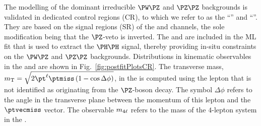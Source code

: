 The modelling of the dominant irreducible $\PW\PZ$ and $\PZ\PZ$ backgrounds is validated in dedicated control regions (CR),
to which we refer to as the ``\threeLeptonCR'' and ``\fourLeptonCR''.
They are based on the signal regions (SR) of the \threeLeptonZeroTau and \fourLeptonZeroTau channels,
the sole modification being that the $\PZ$-veto is inverted.
The \threeLeptonCR and \fourLeptonCR are included in the ML fit that is used to extract the $\PHiggs\PHiggs$ signal,
thereby providing in-situ constraints on the $\PW\PZ$ and $\PZ\PZ$ backgrounds.
Distributions in kinematic observables in the \threeLeptonCR and \fourLeptonCR are shown in Fig.~\ref{fig:postfitPlotsCR}.
The transverse mass, 
$\mT = \sqrt{2 \pt^{\Plepton} \ptmiss \left( 1 - \cos\Delta\phi \right)}$,
in the \threeLeptonCR is computed using the lepton that is not identified as originating from the $\PZ$-boson decay.
The symbol $\Delta\phi$ refers to the angle in the transverse plane between the momentum of this lepton and the $\ptvecmiss$ vector.
The observable $m_{4\ell}$ refers to the mass of the $4$-lepton system in the \fourLeptonCR.

